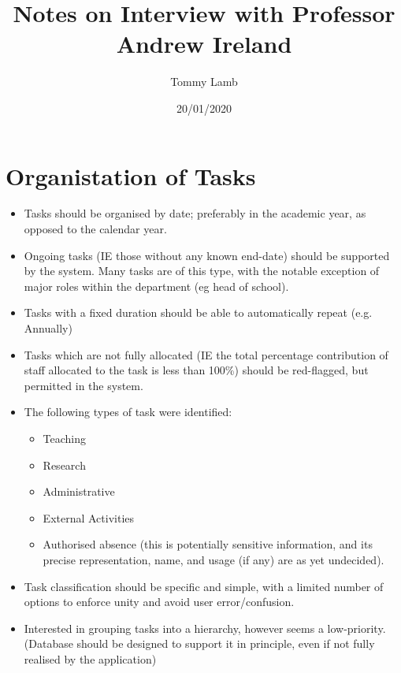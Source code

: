 \documentclass[12pt, a4paper]{article}
\begin{document}
\title{Notes on Interview with Professor Andrew Ireland}
\author{Tommy Lamb}
\date{20/01/2020}

\maketitle


\section{Organistation of Tasks}
\begin{itemize}
\item Tasks should be organised by date; preferably in the academic year, as opposed to the calendar year.
\item Ongoing tasks (IE those without any known end-date) should be supported by the system. Many tasks are of this type, with the notable exception of major roles within the department (eg head of school).
\item Tasks with a fixed duration should be able to automatically repeat (e.g. Annually)
\item Tasks which are not fully allocated (IE the total percentage contribution of staff allocated to the task is less than 100\%) should be red-flagged, but permitted in the system.

\item The following types of task were identified:
\begin{itemize}
\item Teaching
\item Research
\item Administrative
\item External Activities
\item Authorised absence (this is potentially sensitive information, and its precise representation, name, and usage (if any) are as yet undecided).
\end{itemize}
\item Task classification should be specific and simple, with a limited number of options to enforce unity and avoid user error/confusion.

\item Interested in grouping tasks into a hierarchy, however seems a low-priority. (Database should be designed to support it in principle, even if not fully realised by the application)


\end{itemize}
\end{document}
